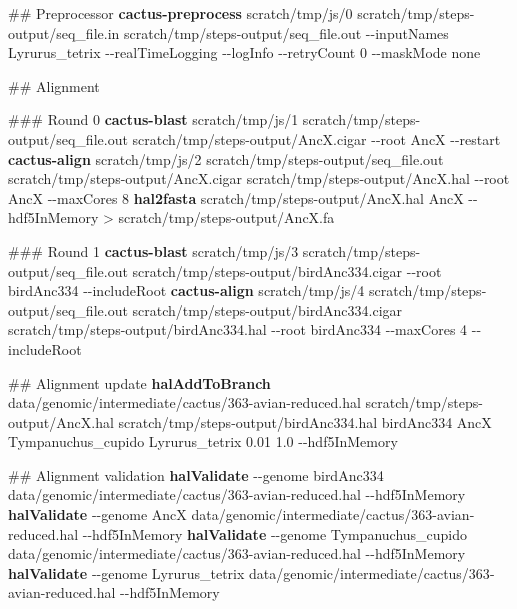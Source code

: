 \documentclass[
  letterpaper,
  DIV=11,
  numbers=noendperiod]{scrreprt}
\newenvironment{Shaded}{}{}
\newcommand{\AttributeTok}[1]{\textcolor[rgb]{0.84,0.23,0.29}{#1}}
\newcommand{\CommentTok}[1]{\textcolor[rgb]{0.42,0.45,0.49}{#1}}
\newcommand{\ExtensionTok}[1]{\textcolor[rgb]{0.84,0.23,0.29}{\textbf{#1}}}
\newcommand{\NormalTok}[1]{\textcolor[rgb]{0.14,0.16,0.18}{#1}}
\newcommand{\OperatorTok}[1]{\textcolor[rgb]{0.14,0.16,0.18}{#1}}
\begin{document}
\begin{Shaded}
\begin{Highlighting}[]
\CommentTok{\#\# Preprocessor}
\ExtensionTok{cactus{-}preprocess}\NormalTok{ scratch/tmp/js/0 scratch/tmp/steps{-}output/seq\_file.in scratch/tmp/steps{-}output/seq\_file.out }\AttributeTok{{-}{-}inputNames}\NormalTok{ Lyrurus\_tetrix }\AttributeTok{{-}{-}realTimeLogging} \AttributeTok{{-}{-}logInfo} \AttributeTok{{-}{-}retryCount}\NormalTok{ 0 }\AttributeTok{{-}{-}maskMode}\NormalTok{ none}

\CommentTok{\#\# Alignment}

\CommentTok{\#\#\# Round 0}
\ExtensionTok{cactus{-}blast}\NormalTok{ scratch/tmp/js/1 scratch/tmp/steps{-}output/seq\_file.out scratch/tmp/steps{-}output/AncX.cigar }\AttributeTok{{-}{-}root}\NormalTok{ AncX }\AttributeTok{{-}{-}restart} 
\ExtensionTok{cactus{-}align}\NormalTok{ scratch/tmp/js/2 scratch/tmp/steps{-}output/seq\_file.out scratch/tmp/steps{-}output/AncX.cigar scratch/tmp/steps{-}output/AncX.hal }\AttributeTok{{-}{-}root}\NormalTok{ AncX  }\AttributeTok{{-}{-}maxCores}\NormalTok{ 8 }
\ExtensionTok{hal2fasta}\NormalTok{ scratch/tmp/steps{-}output/AncX.hal AncX }\AttributeTok{{-}{-}hdf5InMemory} \OperatorTok{\textgreater{}}\NormalTok{ scratch/tmp/steps{-}output/AncX.fa }

\CommentTok{\#\#\# Round 1}
\ExtensionTok{cactus{-}blast}\NormalTok{ scratch/tmp/js/3 scratch/tmp/steps{-}output/seq\_file.out scratch/tmp/steps{-}output/birdAnc334.cigar }\AttributeTok{{-}{-}root}\NormalTok{ birdAnc334 }\AttributeTok{{-}{-}includeRoot}  
\ExtensionTok{cactus{-}align}\NormalTok{ scratch/tmp/js/4 scratch/tmp/steps{-}output/seq\_file.out scratch/tmp/steps{-}output/birdAnc334.cigar scratch/tmp/steps{-}output/birdAnc334.hal }\AttributeTok{{-}{-}root}\NormalTok{ birdAnc334  }\AttributeTok{{-}{-}maxCores}\NormalTok{ 4 }\AttributeTok{{-}{-}includeRoot}  

\CommentTok{\#\# Alignment update}
\ExtensionTok{halAddToBranch}\NormalTok{ data/genomic/intermediate/cactus/363{-}avian{-}reduced.hal scratch/tmp/steps{-}output/AncX.hal scratch/tmp/steps{-}output/birdAnc334.hal birdAnc334 AncX Tympanuchus\_cupido Lyrurus\_tetrix 0.01 1.0 }\AttributeTok{{-}{-}hdf5InMemory} 

\CommentTok{\#\# Alignment validation}
\ExtensionTok{halValidate} \AttributeTok{{-}{-}genome}\NormalTok{ birdAnc334 data/genomic/intermediate/cactus/363{-}avian{-}reduced.hal }\AttributeTok{{-}{-}hdf5InMemory}
\ExtensionTok{halValidate} \AttributeTok{{-}{-}genome}\NormalTok{ AncX data/genomic/intermediate/cactus/363{-}avian{-}reduced.hal }\AttributeTok{{-}{-}hdf5InMemory}
\ExtensionTok{halValidate} \AttributeTok{{-}{-}genome}\NormalTok{ Tympanuchus\_cupido data/genomic/intermediate/cactus/363{-}avian{-}reduced.hal }\AttributeTok{{-}{-}hdf5InMemory}
\ExtensionTok{halValidate} \AttributeTok{{-}{-}genome}\NormalTok{ Lyrurus\_tetrix data/genomic/intermediate/cactus/363{-}avian{-}reduced.hal }\AttributeTok{{-}{-}hdf5InMemory}
\end{Highlighting}
\end{Shaded}
\end{document}
